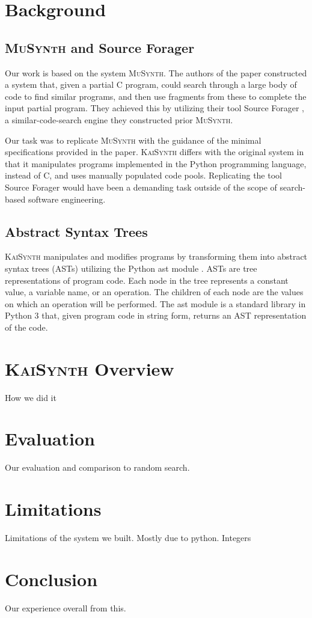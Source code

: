 \documentclass{article}
\begin{document}
\section{Background}
\subsection{\textsc{MuSynth} and Source Forager}
Our work is based on the system \textsc{MuSynth}. The authors of the paper constructed a system that, given a partial C program, could search through a large body of code to find similar programs, and then use fragments from these to complete the input partial program. They achieved this by utilizing their tool Source Forager \cite{sourceforager}, a similar-code-search engine they constructed prior \textsc{MuSynth}.

Our task was to replicate \textsc{MuSynth} with the guidance of the minimal specifications provided in the paper. \textsc{KaiSynth} differs with the original system in that it manipulates programs implemented in the Python programming language, instead of C, and uses manually populated code pools. Replicating the tool Source Forager would have been a demanding task outside of the scope of search-based software engineering.

\subsection{Abstract Syntax Trees}
\textsc{KaiSynth} manipulates and modifies programs by transforming them into abstract syntax trees (ASTs) utilizing the Python ast module \cite{astpython}. ASTs are tree representations of program code. Each node in the tree represents a constant value, a variable name, or an operation. The children of each node are the values on which an operation will be performed.  The ast module is a standard library in Python 3 that, given program code in string form, returns an AST representation of the code.


\section{\textsc{KaiSynth} Overview}
How we did it

\section{Evaluation}
Our evaluation and comparison to random search.

\section{Limitations}
Limitations of the system we built. Mostly due to python.
Integers 

\section{Conclusion}
Our experience overall from this.

\printbibliography
\end{document}
